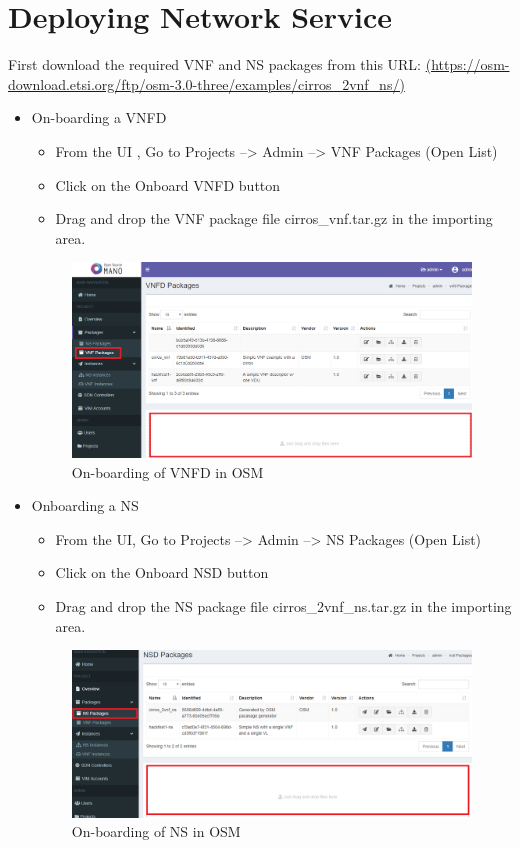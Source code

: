 \section{Deploying Network Service}
First download the required VNF and NS packages from this URL: \hyperlink{name}{(https://osm-download.etsi.org/ftp/osm-3.0-three/examples/cirros\_2vnf\_ns/)}
\begin{itemize}
\item On-boarding a VNFD
\begin{itemize}
\item From the UI , Go to Projects --> Admin --> VNF Packages (Open List)
\item Click on the Onboard VNFD button
\item Drag and drop the VNF package file cirros_vnf.tar.gz in the importing area.
\end{itemize}
\begin{figure} [H]
	\centering
	\includegraphics[width=0.5\linewidth]{figures/sh4}
	\caption{On-boarding of VNFD in OSM}
\end{figure}

\item Onboarding a NS
\begin{itemize}
\item From the UI, Go to Projects --> Admin --> NS Packages (Open List)
\item Click on the Onboard NSD button
\item Drag and drop the NS package file cirros_2vnf_ns.tar.gz in the importing area.
\end{itemize}
\begin{figure} [H]
	\centering
	\includegraphics[width=0.5\linewidth]{figures/sh3}
	\caption{On-boarding of NS in OSM}
\end{figure}



\end{itemize}
